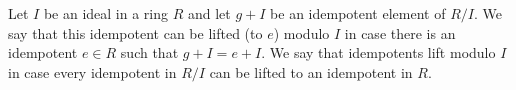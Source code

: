 Let $I$ be an ideal in a ring $R$ and let $g + I$ be an idempotent element of $R/I$. We say that this idempotent can be lifted (to $e$) modulo $I$ in case there is an idempotent $e \in R$ such that $g + I = e + I$. We say that idempotents lift modulo $I$ in case every idempotent in $R/I$ can be lifted to an idempotent in $R$.
